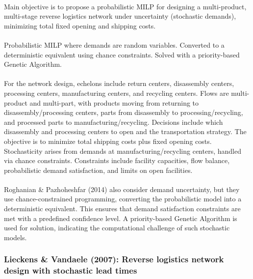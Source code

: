 \paragraph{} Main objective is to propose a probabilistic MILP for designing a multi-product, multi-stage reverse logistics network under uncertainty (stochastic demands), minimizing total fixed opening and shipping costs.

\paragraph{} Probabilistic MILP where demands are random variables. Converted to a deterministic equivalent using chance constraints. Solved with a priority-based Genetic Algorithm.

\paragraph{} For the network design, echelons include return centers, disassembly centers, processing centers, manufacturing centers, and recycling centers. Flows are multi-product and multi-part, with products moving from returning to disassembly/processing centers, parts from disassembly to processing/recycling, and processed parts to manufacturing/recycling. Decisions include which disassembly and processing centers to open and the transportation strategy. The objective is to minimize total shipping costs plus fixed opening costs. Stochasticity arises from demands at manufacturing/recycling centers, handled via chance constraints. Constraints include facility capacities, flow balance, probabilistic demand satisfaction, and limits on open facilities.

\paragraph{} Roghanian \& Pazhoheshfar (2014) also consider demand uncertainty, but they use chance-constrained programming, converting the probabilistic model into a deterministic equivalent. This ensures that demand satisfaction constraints are met with a predefined confidence level. A priority-based Genetic Algorithm is used for solution, indicating the computational challenge of such stochastic models.

\subsubsection{Lieckens \& Vandaele (2007): Reverse logistics network design with stochastic lead times}

